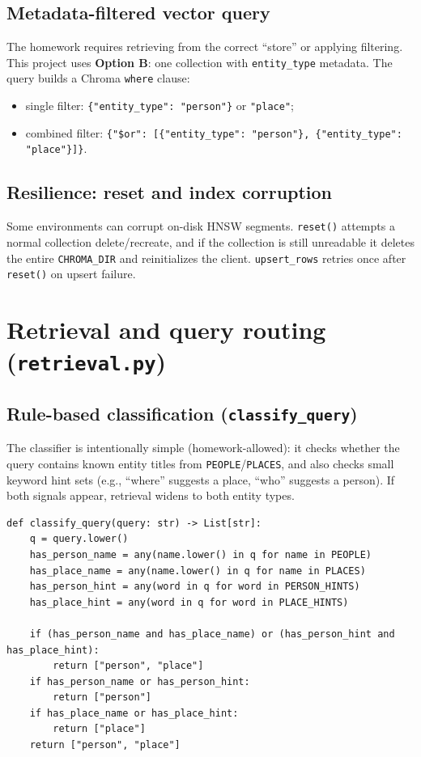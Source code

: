 \documentclass[11pt,a4paper]{article}
\begin{document}
\subsection{Metadata-filtered vector query}
The homework requires retrieving from the correct ``store'' or applying filtering.
This project uses \textbf{Option B}: one collection with \texttt{entity\_type} metadata.
The query builds a Chroma \texttt{where} clause:
\begin{itemize}[leftmargin=*]
  \item single filter: \texttt{\{"entity\_type": "person"\}} or \texttt{"place"};
  \item combined filter: \texttt{\{"\$or": [\{"entity\_type": "person"\}, \{"entity\_type": "place"\}]\}}.
\end{itemize}

\subsection{Resilience: reset and index corruption}
Some environments can corrupt on-disk HNSW segments. \texttt{reset()} attempts a normal
collection delete/recreate, and if the collection is still unreadable it deletes the
entire \texttt{CHROMA\_DIR} and reinitializes the client. \texttt{upsert\_rows} retries once
after \texttt{reset()} on upsert failure.

\section{Retrieval and query routing (\texttt{retrieval.py})}

\subsection{Rule-based classification (\texttt{classify\_query})}
The classifier is intentionally simple (homework-allowed): it checks whether the query
contains known entity titles from \texttt{PEOPLE}/\texttt{PLACES}, and also checks small
keyword hint sets (e.g., ``where'' suggests a place, ``who'' suggests a person). If both
signals appear, retrieval widens to both entity types.

\begin{lstlisting}[caption={Query routing logic (\texttt{retrieval.py}, excerpt).},label={lst:classify}]
def classify_query(query: str) -> List[str]:
    q = query.lower()
    has_person_name = any(name.lower() in q for name in PEOPLE)
    has_place_name = any(name.lower() in q for name in PLACES)
    has_person_hint = any(word in q for word in PERSON_HINTS)
    has_place_hint = any(word in q for word in PLACE_HINTS)

    if (has_person_name and has_place_name) or (has_person_hint and has_place_hint):
        return ["person", "place"]
    if has_person_name or has_person_hint:
        return ["person"]
    if has_place_name or has_place_hint:
        return ["place"]
    return ["person", "place"]
\end{lstlisting}
\end{document}
